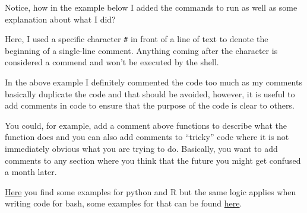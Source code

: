 \documentclass[
  letterpaper,
  DIV=11,
  numbers=noendperiod]{scrreprt}
\begin{document}
\begin{tcolorbox}[enhanced jigsaw, rightrule=.15mm, colbacktitle=quarto-callout-tip-color!10!white, colframe=quarto-callout-tip-color-frame, colback=white, arc=.35mm, opacitybacktitle=0.6, coltitle=black, bottomtitle=1mm, breakable, bottomrule=.15mm, leftrule=.75mm, titlerule=0mm, title=\textcolor{quarto-callout-tip-color}{\faLightbulb}\hspace{0.5em}{Tip: commenting your code}, toprule=.15mm, toptitle=1mm, opacityback=0, left=2mm]

Notice, how in the example below I added the commands to run as well as
some explanation about what I did?

Here, I used a specific character \texttt{\#} in front of a line of text
to denote the beginning of a single-line comment. Anything coming after
the character is considered a commend and won't be executed by the
shell.

In the above example I definitely commented the code too much as my
comments basically duplicate the code and that should be avoided,
however, it is useful to add comments in code to ensure that the purpose
of the code is clear to others.

You could, for example, add a comment above functions to describe what
the function does and you can also add comments to ``tricky'' code where
it is not immediately obvious what you are trying to do. Basically, you
want to add comments to any section where you think that the future you
might get confused a month later.

\href{https://best-practice-and-impact.github.io/qa-of-code-guidance/code_documentation.html}{Here}
you find some examples for python and R but the same logic applies when
writing code for bash, some examples for that can be found
\href{https://linuxize.com/post/bash-comments/}{here}.

\end{tcolorbox}
\end{document}
